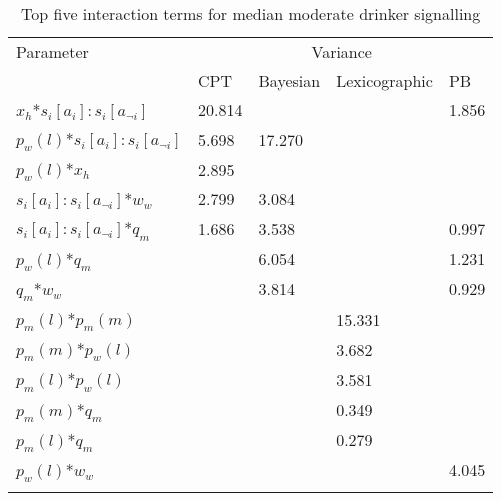 \begin{table}[H]
\caption{Top five interaction terms for median moderate drinker signalling \label{tab:sa_interaction_prospect_sig}}
\begin{tabular} {lllll}
\hline\noalign{\smallskip}
Parameter & \multicolumn{4}{c}{Variance} \\ 
& \ac{CPT} & Bayesian & Lexicographic & \ac{PB} \\
\noalign{\smallskip}\svhline\noalign{\smallskip}

\(x_{h}\)*\(s_{i}[a_{i}]:s_{i}[a_{\neg i}]\) & 20.814 & & & 1.856\\
\(p_{w}(l)\)*\(s_{i}[a_{i}]:s_{i}[a_{\neg i}]\) & 5.698 & 17.270 & &\\
\(p_{w}(l)\)*\(x_{h}\) & 2.895 & & &\\
\(s_{i}[a_{i}]:s_{i}[a_{\neg i}]\)*\(w_{w}\) & 2.799 & 3.084 & &\\
\(s_{i}[a_{i}]:s_{i}[a_{\neg i}]\)*\(q_{m}\) & 1.686 & 3.538 & & 0.997\\
\(p_{w}(l)\)*\(q_{m}\) & & 6.054 & & 1.231\\
\(q_{m}\)*\(w_{w}\) & & 3.814 & & 0.929\\
\(p_{m}(l)\)*\(p_{m}(m)\) & & & 15.331\\
\(p_{m}(m)\)*\(p_{w}(l)\) & & & 3.682\\
\(p_{m}(l)\)*\(p_{w}(l)\) & & & 3.581\\
\(p_{m}(m)\)*\(q_{m}\) & & & 0.349\\
\(p_{m}(l)\)*\(q_{m}\) & & & 0.279\\
\(p_{w}(l)\)*\(w_{w}\) & & & & 4.045\\
\noalign{\smallskip}\hline\noalign{\smallskip}
\end{tabular}
\end{table}
